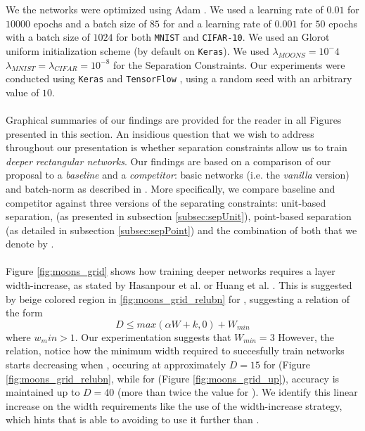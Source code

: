 We the networks were optimized using Adam \cite{adam}. We used a learning rate of $0.01$ for $10000$ epochs and a batch size of $85$ for \moons and a learning rate of $0.001$ for $50$ epochs with a batch size of $1024$ for both \texttt{MNIST} and \texttt{CIFAR-10}. We used an Glorot uniform initialization scheme \cite{Glorot10Initialization} (by default on \texttt{Keras}). We used $\lambda_{MOONS}=10^-4$ $\lambda_{MNIST}=\lambda_{CIFAR}=10^{-8}$ for the Separation Constraints. Our experiments were conducted using \texttt{Keras} \cite{keras} and \texttt{TensorFlow} \cite{tensorflow}, using a random seed with an arbitrary value of $10$. 
\\\\
Graphical summaries of our findings are provided for the reader in all Figures presented in this section. An insidious question that we wish to address throughout our presentation is whether
separation constraints allow us to train \emph{deeper} \emph{rectangular networks}. Our findings are based on a comparison of our proposal to a \emph{baseline} and a \emph{competitor}:  basic \ReLU networks (i.e. the \emph{vanilla} version) and batch-norm as described in \cite{batchnorm}. More specifically, we compare baseline and competitor against three versions of the separating constraints: unit-based separation, (as presented in subsection \ref{subsec:sepUnit}), point-based separation (as detailed in subsection \ref{subsec:sepPoint}) and the combination of both that we denote by \SepUnitPoint. 
\\\\
Figure \ref{fig:moons_grid} shows how training deeper networks requires a layer width-increase, as stated by Hasanpour et al. \cite{simpnet} or Huang et al. \cite{densenet}. This is suggested by beige colored region in \ref{fig:moons_grid_relubn} for \ReLUBN, suggesting a relation of the form
\begin{equation}\label{eq:dependencyWidthDepth}
    D \leq max(\alpha{W} + k, 0) + W_{min}
\end{equation}
where  $w_min>1$. Our experimentation suggests that $W_{min}=3$ However, the relation, notice how the minimum width required to succesfully train networks starts decreasing when , occuring at approximately $D=15$ for \ReLUBN (Figure \ref{fig:moons_grid_relubn}, while for \SepUnitPoint (Figure \ref{fig:moons_grid_up}), accuracy is maintained up to $D=40$ (more than twice the value for \ReLUBN). We identify this linear increase on the width requirements like the use of the width-increase strategy, which hints that \SepPoint is able to avoiding to use it further than \ReLUBN.

